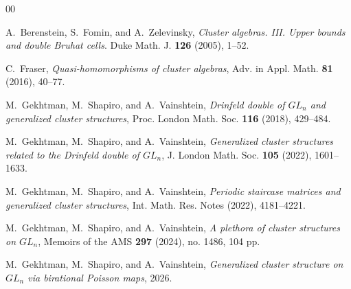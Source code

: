 \documentclass{amsart}
\theoremstyle{definition}
\theoremstyle{remark}
\numberwithin{equation}{section}
\numberwithin{theorem}{section}
\begin{document}
\begin{thebibliography}{00}

  A.~Berenstein, S.~Fomin, and A.~Zelevinsky,
\textit{Cluster algebras. III. Upper bounds and double Bruhat cells}.
Duke Math. J. \textbf{126} (2005), 1--52.

  C.~Fraser, {\it Quasi-homomorphisms of cluster algebras}, Adv. in Appl. Math. {\bf 81} (2016), 40--77. 

 M.~Gekhtman, M.~Shapiro, and A.~Vainshtein,  \textit{Drinfeld double of $GL_n$ and generalized cluster structures}, Proc. London Math. Soc. \textbf{116} (2018), 429--484.

 M.~Gekhtman, M.~Shapiro, and A.~Vainshtein,  \textit{Generalized cluster structures related to the Drinfeld double of $GL_n$}, J. London Math. Soc. \textbf{105} (2022), 1601--1633.


  M.~Gekhtman, M.~Shapiro, and A.~Vainshtein, 
\textit{Periodic staircase matrices and generalized cluster structures},
Int. Math. Res. Notes (2022), 4181--4221.

  M.~Gekhtman, M.~Shapiro, and A.~Vainshtein,  
\textit{A plethora of cluster structures on $GL_n$}, 
Memoirs of the AMS {\bf 297} (2024), no. 1486, 104 pp.

 M.~Gekhtman, M.~Shapiro, and A.~Vainshtein, 
\textit{Generalized cluster structure on $GL_n$ via birational Poisson maps}, 2026.

\end{thebibliography}
\end{document}
